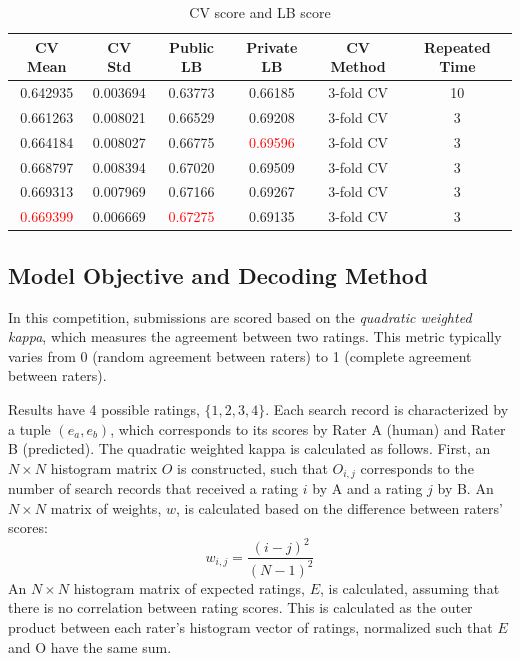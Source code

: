 \documentclass[12pt]{article}
\begin{document}
\begin{table}[t]
\centering
\caption{CV score and LB score}
    \label{CV_LB}
\begin{tabular}{|c|c|c|c|c|c|}
\hline
CV Mean   & CV Std  &  Public LB  &    Private LB   &   CV Method   &  Repeated Time\\
\hline\hline
0.642935  & 0.003694  &  0.63773   &  0.66185  & 3-fold CV     &     10\\
0.661263  & 0.008021  &  0.66529   &  0.69208 &  3-fold CV     &     3\\
0.664184  & 0.008027  &  0.66775   &  \textcolor{red}{0.69596} &  3-fold CV    &      3\\
0.668797  & 0.008394  &  0.67020   &  0.69509 &  3-fold CV    &      3\\
0.669313  & 0.007969  &  0.67166   &  0.69267 &  3-fold CV    &      3\\
\textcolor{red}{0.669399}  & 0.006669  &  \textcolor{red}{0.67275}   &  0.69135 &  3-fold CV    &      3\\
\hline
\end{tabular}
\end{table}

\subsection{Model Objective and Decoding Method}
In this competition, submissions are scored based on the \emph{quadratic weighted kappa}, which measures the agreement between two ratings. This metric typically varies from 0 (random agreement between raters) to 1 (complete agreement between raters).

Results have 4 possible ratings, $\{1,2,3,4\}$. Each search record is characterized by a tuple $(e_a,e_b)$, which corresponds to its scores by Rater A (human) and Rater B (predicted). The quadratic weighted kappa is calculated as follows. First, an $N\times{N}$ histogram matrix $O$ is constructed, such that $O_{i,j}$ corresponds to the number of search records that received a rating $i$ by A and a rating $j$ by B. An $N\times{N}$ matrix of weights, $w$, is calculated based on the difference between raters' scores:
\begin{equation}
w_{i,j} = \frac{(i-j)^2}{(N-1)^2}
\end{equation}
An $N\times{N}$ histogram matrix of expected ratings, $E$, is calculated, assuming that there is no correlation between rating scores. This is calculated as the outer product between each rater's histogram vector of ratings, normalized such that $E$ and O have the same sum.
\end{document}
